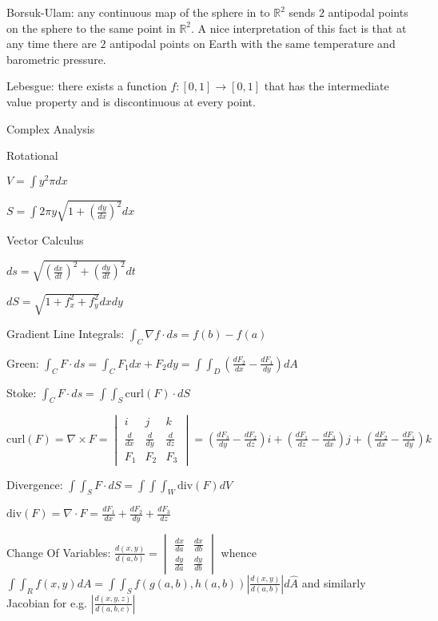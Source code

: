 Borsuk-Ulam: any continuous map of the sphere in to $\mathbb{R}^2$ sends $2$ antipodal points on the sphere to the same point in $\mathbb{R}^2$. A nice interpretation of this fact is that at any time there are $2$ antipodal points on Earth with the same temperature and barometric pressure.

Lebesgue: there exists a function $f: [0,1] \to [0,1]$ that has the intermediate value property and is discontinuous at every point.

Complex Analysis

Rotational

$V = \int y^2 \pi dx$

$S = \int 2\pi y \sqrt{1+\left(\frac{dy}{dx} \right)^2} dx$

Vector Calculus

$ds=\sqrt{\left(\frac{dx}{dt} \right)^2 + \left(\frac{dy}{dt} \right)^2} dt$

$dS = \sqrt{1+f_x^2+f_y^2} dx dy$

Gradient Line Integrals: $\int_C \nabla f \cdot ds = f(b)-f(a)$

Green: $\int_C F \cdot ds = \int_C F_1 dx + F_2 dy = \int \int_D \left(\frac{dF_2}{dx} - \frac{dF_1}{dy} \right) dA$

Stoke: $\int_C F \cdot ds = \int \int_S \text{curl}(F) \cdot dS$

$\text{curl}(F) = \nabla \times F = \begin{vmatrix} i & j & k \\ \frac{d}{dx} & \frac{d}{dy} & \frac{d}{dz} \\ F_1 & F_2 & F_3 \end{vmatrix} = \left(\frac{dF_3}{dy}-\frac{dF_2}{dz} \right) i + \left(\frac{dF_1}{dz}-\frac{dF_3}{dx} \right) j + \left(\frac{dF_2}{dx}-\frac{dF_1}{dy} \right) k$

Divergence: $\int \int_S F \cdot dS = \int \int \int_W \text{div}(F)dV$

$\text{div}(F)=\nabla \cdot F=\frac{dF_1}{dx}+\frac{dF_2}{dy}+\frac{dF_3}{dz}$

Change Of Variables: $\frac{d(x,y)}{d(a,b)} = \begin{vmatrix} \frac{dx}{da} & \frac{dx}{db} \\ \frac{dy}{da} & \frac{dy}{db} \end{vmatrix}$ whence $\int \int_R f(x,y) dA = \int \int_S f(g(a,b),h(a,b)) \left| \frac{d(x,y)}{d(a,b)} \right| d\hat{A}$ and similarly Jacobian for e.g. $\left| \frac{d(x,y,z)}{d(a,b,c)} \right|$


